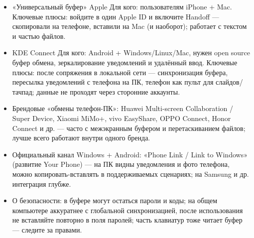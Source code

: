 \begin{itemize}
  \item «Универсальный буфер» Apple Для кого: пользователям iPhone + Mac. Ключевые плюсы: войдите в один Apple ID и включите Handoff — скопировали на телефоне, вставили на Mac (и наоборот); работает с текстом и частью файлов.
  \item KDE Connect Для кого: Android + Windows/Linux/Mac, нужен open source буфер обмена, зеркалирование уведомлений и удалённый ввод. Ключевые плюсы: после сопряжения в локальной сети — синхронизация буфера, пересылка уведомлений с телефона на ПК, телефон как пульт для слайдов/тачпад; данные не проходят через сторонние аккаунты.
  \item Брендовые «обмены телефон-ПК»: Huawei Multi-screen Collaboration / Super Device, Xiaomi MiMo+, vivo EasyShare, OPPO Connect, Honor Connect и др. — часто с межэкранным буфером и перетаскиванием файлов; лучше всего работают внутри одного бренда.
  \item Официальный канал Windows + Android: «Phone Link / Link to Windows» (развитие Your Phone) — на ПК видны уведомления и фото телефона, можно копировать-вставлять в поддерживаемых сценариях; на Samsung и др. интеграция глубже.
  \item О безопасности: в буфере могут остаться пароли и коды; на общем компьютере аккуратнее с глобальной синхронизацией, после использования не вставляйте повторно в поля паролей; часть клавиатур тоже читает буфер — следите за правами.
\end{itemize}


